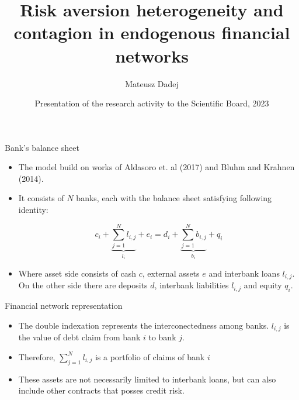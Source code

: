 \documentclass{beamer}
\title{Risk aversion heterogeneity and contagion in
endogenous financial networks}
\author{Mateusz Dadej}
\institute{University of Brescia}
\date[VLC 2023] %
{Presentation of the research activity to the Scientific Board, 2023}
\begin{document}
\begin{frame}
\titlepage
\end{frame}

\begin{frame}{Bank's balance sheet}

    \begin{itemize}
        \item The model build on works of Aldasoro et. al (2017) and Bluhm and Krahnen (2014). %
        \item It consists of $N$ banks, each with the balance sheet satisfying following identity:
        
        \[c_i + \underbrace{\sum_{j=1}^{N}l_{i,j}}_{l_i} + e_i = d_i + \underbrace{\sum_{j=1}^{N}b_{i,j}}_{b_i} + q_i\]

        \item Where asset side consists of cash $c$, external assets $e$ and interbank loans $l_{i,j}$. On the other side there are deposits $d$, interbank liabilities $l_{i,j}$ and equity $q_i$.
        
    \end{itemize}

\end{frame}

\begin{frame}{Financial network representation}

    \begin{itemize}
        \item The double indexation represents the interconectedness among banks. $l_{i,j}$ is the value of debt claim from bank $i$ to bank $j$.
        \item Therefore, $\sum_{j=1}^{N}l_{i,j}$ is a portfolio of claims of bank $i$
        \item These assets are not necessarily limited to interbank loans, but can also include other contracts that posses credit risk.
    \end{itemize}   

\end{frame}
\end{document}
